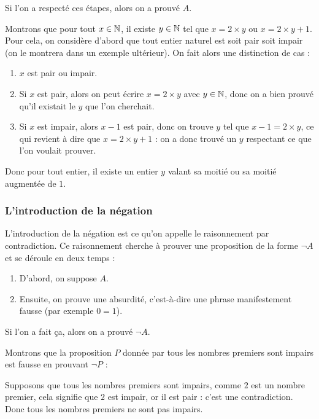 Si l'on a respecté ces étapes, alors on a prouvé $A$.

\begin{expl}
    Montrons que pour tout $x\in \mathbb{N}$, il existe $y\in \mathbb{N}$ tel que $x=2\times y$ ou $x=2\times y + 1$. Pour cela, on considère d'abord que tout entier naturel est soit pair soit impair (on le montrera dans un exemple ultérieur). On fait alors une distinction de cas :
    \begin{enumerate}
        \item $x$ est pair ou impair.
        \item Si $x$ est pair, alors on peut écrire $x=2\times y$ avec $y\in \mathbb{N}$, donc on a bien prouvé qu'il existait le $y$ que l'on cherchait.
        \item Si $x$ est impair, alors $x-1$ est pair, donc on trouve $y$ tel que $x-1=2\times y$, ce qui revient à dire que $x=2\times y + 1$ : on a donc trouvé un $y$ respectant ce que l'on voulait prouver.
    \end{enumerate}
    Donc pour tout entier, il existe un entier $y$ valant sa moitié ou sa moitié augmentée de $1$.
\end{expl}

\subsubsection{L'introduction de la négation}

L'introduction de la négation est ce qu'on appelle le raisonnement par contradiction. Ce raisonnement cherche à prouver une proposition de la forme $\lnot A$ et se déroule en deux temps :

\begin{enumerate}
    \item D'abord, on suppose $A$.
    \item Ensuite, on prouve une absurdité, c'est-à-dire une phrase manifestement fausse (par exemple $0=1$).
\end{enumerate}

Si l'on a fait ça, alors on a prouvé $\lnot A$.

\begin{expl}
    Montrons que la proposition $P$ donnée par \og tous les nombres premiers sont impairs\fg{} est fausse en prouvant $\lnot P$ :
    
    Supposons que tous les nombres premiers sont impairs, comme $2$ est un nombre premier, cela signifie que $2$ est impair, or il est pair : c'est une contradiction. Donc tous les nombres premiers ne sont pas impairs.
\end{expl}

